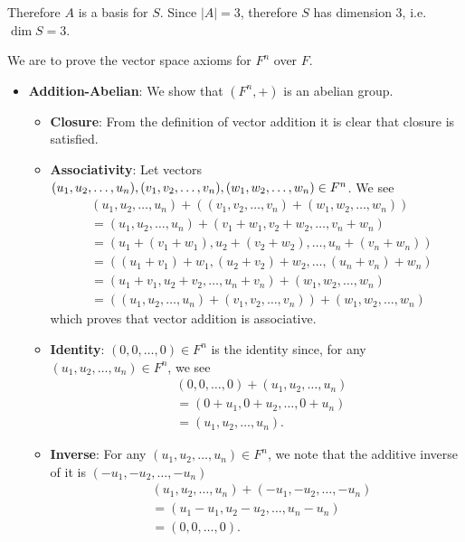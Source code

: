 \begin{questions}
\begin{partquestions}{\alph*}
        Therefore $A$ is a basis for $S$. Since $|A| = 3$, therefore $S$ has dimension 3, i.e. $\dim{S} = 3$.
    \end{partquestions}

    \item We are to prove the vector space axioms for $F^n$ over $F$.
    \begin{itemize}
        \item \textbf{Addition-Abelian}: We show that $(F^n, +)$ is an abelian group.
        \begin{itemize}
            \item \textbf{Closure}: From the definition of vector addition it is clear that closure is satisfied.

            \item \textbf{Associativity}: Let vectors $(u_1, u_2, \dots, u_n), (v_1, v_2, \dots, v_n), \linebreak (w_1, w_2, \dots, w_n) \in F^n$. We see
            \begin{align*}
                &(u_1, u_2, \dots, u_n) + ((v_1, v_2, \dots, v_n) + (w_1, w_2, \dots, w_n))\\
                &= (u_1, u_2, \dots, u_n) + (v_1 + w_1, v_2 + w_2, \dots, v_n + w_n)\\
                &= (u_1 + (v_1 + w_1), u_2 + (v_2 + w_2), \dots, u_n + (v_n + w_n))\\
                &= ((u_1 + v_1) + w_1, (u_2 + v_2) + w_2, \dots, (u_n + v_n) + w_n)\\
                &= (u_1 + v_1, u_2 + v_2, \dots, u_n + v_n) + (w_1, w_2, \dots, w_n)\\
                &= ((u_1, u_2, \dots, u_n) + (v_1, v_2, \dots, v_n)) + (w_1, w_2, \dots, w_n)
            \end{align*}
            which proves that vector addition is associative.

            \item \textbf{Identity}: $(0, 0, \dots, 0) \in F^n$ is the identity since, for any $(u_1, u_2, \dots, u_n) \in F^n$, we see
            \begin{align*}
                &(0, 0, \dots, 0) + (u_1, u_2, \dots, u_n)\\
                &= (0 + u_1, 0 + u_2, \dots, 0 + u_n)\\
                &= (u_1, u_2, \dots, u_n).
            \end{align*}

            \item \textbf{Inverse}: For any $(u_1, u_2, \dots, u_n) \in F^n$, we note that the additive inverse of it is $(-u_1, -u_2, \dots, -u_n)$
            \begin{align*}
                &(u_1, u_2, \dots, u_n) + (-u_1, -u_2, \dots, -u_n)\\
                &= (u_1 - u_1, u_2 - u_2, \dots, u_n - u_n)\\
                &= (0, 0, \dots, 0).
            \end{align*}


\end{itemize}
\end{itemize}
\end{questions}
